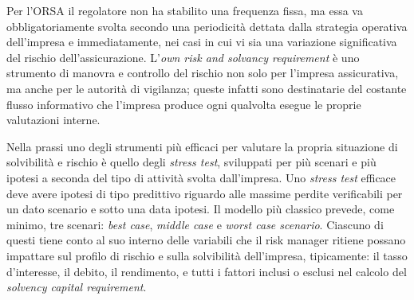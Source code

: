 Per l’ORSA il regolatore non ha stabilito una frequenza fissa, ma essa va obbligatoriamente svolta secondo una periodicità dettata dalla strategia operativa dell’impresa e immediatamente, nei casi in cui vi sia una variazione significativa del rischio dell’assicurazione.
L’{\itshape own risk and solvancy requirement} è uno strumento di manovra e controllo del rischio non solo per l’impresa assicurativa, ma anche per le autorità di vigilanza; queste infatti sono destinatarie del costante flusso informativo che l’impresa produce ogni qualvolta esegue le proprie valutazioni interne.

Nella prassi uno degli strumenti più efficaci per valutare la propria situazione di solvibilità e rischio è quello degli {\itshape stress test}, sviluppati per più scenari e più ipotesi a seconda del tipo di attività svolta dall’impresa. Uno {\itshape stress test} efficace deve avere ipotesi di tipo predittivo riguardo alle massime perdite verificabili per un dato scenario e sotto una data ipotesi.
Il modello più classico prevede, come minimo, tre scenari: {\itshape best case}, {\itshape middle case} e {\itshape worst case scenario}. Ciascuno di questi tiene conto al suo interno delle variabili che il risk manager ritiene possano impattare sul profilo di rischio e sulla solvibilità dell’impresa, tipicamente: il tasso d’interesse, il debito, il rendimento, e tutti i fattori inclusi o esclusi nel calcolo del {\itshape solvency capital requirement}.

